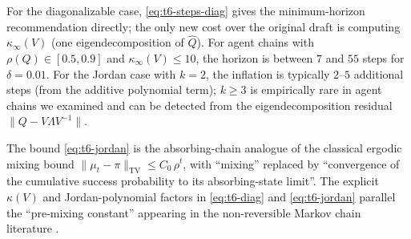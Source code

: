 \begin{remark}
For the diagonalizable case, \eqref{eq:t6-steps-diag} gives the
minimum-horizon recommendation directly; the only new cost over the
original draft is computing $\kappa_\infty(V)$ (one eigendecomposition
of $\widehat{Q}$). For agent chains with $\rho(Q)\in[0.5,0.9]$ and
$\kappa_\infty(V)\le 10$, the horizon is between $7$ and $55$ steps for
$\delta=0.01$. For the Jordan case with $k=2$, the inflation is
typically $2$--$5$ additional steps (from the additive polynomial
term); $k\ge 3$ is empirically rare in agent chains we examined and
can be detected from the eigendecomposition residual
$\|Q - V\Lambda V^{-1}\|$.
\end{remark}

\begin{remark}
The bound \eqref{eq:t6-jordan} is the absorbing-chain analogue of
the classical ergodic mixing bound
$\|\mu_t-\pi\|_\mathrm{TV}\le C_0\,\rho^t$, with
``mixing'' replaced by ``convergence of the cumulative success
probability to its absorbing-state limit''. The explicit $\kappa(V)$
and Jordan-polynomial factors in \eqref{eq:t6-diag} and
\eqref{eq:t6-jordan} parallel the ``pre-mixing constant'' appearing
in the non-reversible Markov chain literature
\cite[Thm.~12.3]{levin2017markov}.
\end{remark}
\fi
